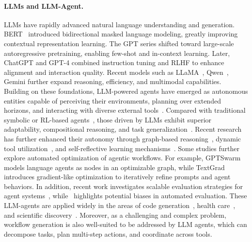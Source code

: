 \documentclass[runningheads]{llncs}
\begin{document}
\paragraph{LLMs and LLM-Agent.}
LLMs have rapidly advanced natural language understanding and generation. BERT~\cite{devlin2019bert} introduced bidirectional masked language modeling, greatly improving contextual representation learning. The GPT series \cite{brown2020language} shifted toward large-scale autoregressive pretraining, enabling few-shot and in-context learning. Later, ChatGPT and GPT-4 \cite{achiam2023gpt} combined instruction tuning and RLHF to enhance alignment and interaction quality. Recent models such as LLaMA~\cite{touvron2023llama}, Qwen~\cite{yang2025qwen3}, Gemini \cite{team2023gemini,comanici2025gemini} further expand reasoning, efficiency, and multimodal capabilities. 
Building on these foundations, LLM-powered agents have emerged as autonomous entities capable of perceiving their environments, planning over extended horizons, and interacting with diverse external tools~\cite{franklin1996agent,achiam2023gpt}. 
Compared with traditional symbolic or RL-based agents~\cite{silver2018general,hwangbo2019learning}, those driven by LLMs exhibit superior adaptability, compositional reasoning, and task generalization~\cite{chen2023autoagents,li2024multimodal}. Recent research has further enhanced their autonomy through graph-based reasoning~\cite{yao2024tree,besta2024graph}, dynamic tool utilization~\cite{qian2025toolrl,li2025torlscalingtoolintegratedrl,shen2024hugginggpt,wu2023visual}, and self-reflective learning mechanisms~\cite{shinn2024reflexion}.
Some studies further explore automated optimization of agentic workflows. For example, GPTSwarm~\cite{zhuge2024gptswarm} models language agents as nodes in an optimizable graph, while TextGrad~\cite{yuksekgonul2024textgrad} introduces gradient-like optimization to iteratively refine prompts and agent behaviors. In addition, recent work investigates scalable evaluation strategies for agent systems~\cite{zhuge2024agent}, while~\cite{chen2024humans} highlights potential biases in automated evaluation.
These LLM-agents are applied widely in the areas of code generation~\cite{cursor2024}, health care~\cite{luo2022biogpt,singhal2023large}, and scientific discovery~\cite{taylor2022galactica}. Moreover, as a challenging and complex problem, workflow generation is also well-suited to be addressed by LLM agents, which can decompose tasks, plan multi-step actions, and coordinate across tools.
\end{document}
